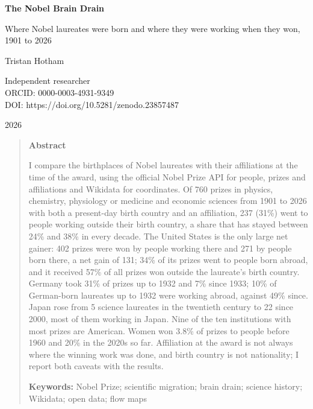 \documentclass[11pt,a4paper]{article}
\begin{document}
\begin{center}
{\Large\bfseries The Nobel Brain Drain\par}
\vspace{0.4em}
{\large Where Nobel laureates were born and where they were working when they won,\\1901 to 2026\par}
\vspace{1.2em}
{\large Tristan Hotham\par}
\vspace{0.3em}
{\small Independent researcher\\
ORCID: 0000-0003-4931-9349\\
DOI: https://doi.org/10.5281/zenodo.23857487\par}
\vspace{0.8em}
2026
\end{center}

\begin{quote}
\small
\begin{center}\textbf{Abstract}\end{center}
I compare the birthplaces of Nobel laureates with their affiliations at the time of the award, using the official Nobel Prize API for people, prizes and affiliations and Wikidata for coordinates. Of 760 prizes in physics, chemistry, physiology or medicine and economic sciences from 1901 to 2026 with both a present-day birth country and an affiliation, 237 (31\%) went to people working outside their birth country, a share that has stayed between 24\% and 38\% in every decade. The United States is the only large net gainer: 402 prizes were won by people working there and 271 by people born there, a net gain of 131; 34\% of its prizes went to people born abroad, and it received 57\% of all prizes won outside the laureate's birth country. Germany took 31\% of prizes up to 1932 and 7\% since 1933; 10\% of German-born laureates up to 1932 were working abroad, against 49\% since. Japan rose from 5 science laureates in the twentieth century to 22 since 2000, most of them working in Japan. Nine of the ten institutions with most prizes are American. Women won 3.8\% of prizes to people before 1960 and 20\% in the 2020s so far. Affiliation at the award is not always where the winning work was done, and birth country is not nationality; I report both caveats with the results.

\textbf{Keywords:} Nobel Prize; scientific migration; brain drain; science history; Wikidata; open data; flow maps
\end{quote}
\end{document}
